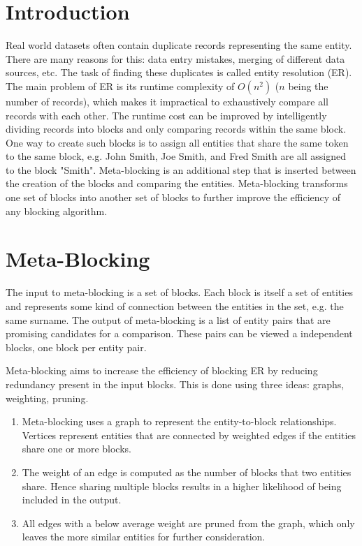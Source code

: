 \documentclass[a4paper,12pt]{article}
\begin{document}
\section{Introduction}
Real world datasets often contain duplicate records representing the same entity. There are many reasons for this: data entry mistakes, merging of different data sources, etc. The task of finding these duplicates is called entity resolution (ER). The main problem of ER is its runtime complexity of $O(n^{2})$ ($n$ being the number of records), which makes it impractical to exhaustively compare all records with each other. The runtime cost can be improved by intelligently dividing records into blocks and only comparing records within the same block.
One way to create such blocks is to assign all entities that share the same token to the same block, e.g. John Smith, Joe Smith, and Fred Smith are all assigned to the block "Smith". Meta-blocking \cite{10.1109/TKDE.2013.54} is an additional step that is inserted between the creation of the blocks and comparing the entities. Meta-blocking transforms one set of blocks into another set of blocks to further improve the efficiency of any blocking algorithm.

\section{Meta-Blocking}
The input to meta-blocking is a set of blocks. Each block is itself a set of entities and represents some kind of connection between the entities in the set, e.g. the same surname. The output of meta-blocking is a list of entity pairs that are promising candidates for a comparison. These pairs can be viewed a independent blocks, one block per entity pair.

Meta-blocking aims to increase the efficiency of blocking ER by reducing redundancy present in the input blocks. This is done using three ideas: graphs, weighting, pruning.
\begin{enumerate}
  \item Meta-blocking uses a graph to represent the entity-to-block relationships. Vertices represent entities that are connected by weighted edges if the entities share one or more blocks.
  \item The weight of an edge is computed as the number of blocks that two entities share. Hence sharing multiple blocks results in a higher likelihood of being included in the output.
  \item All edges with a below average weight are pruned from the graph, which only leaves the more similar entities for further consideration.
\end{enumerate}
\end{document}
